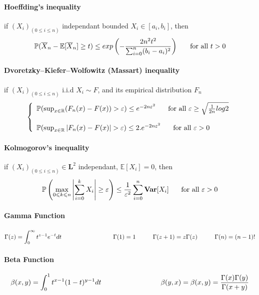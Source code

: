 \documentclass[a4paper,10pt]{article}
\begin{document}
\paragraph{Hoeffding's inequality}
if $(X_{i})_{(0\leqslant i \leqslant n)}$ independant bounded $X_i \in [a_i,b_i]$, then
\[
\mathbb{P}(\overline{X}_n- \mathbb{E}[\overline{X}_n] \geq t) \leq exp\left(-\frac{2n^2t^2}{\sum_{i=0}^{n} (b_i-a_i)^2}\right) 
\hspace{5mm} \text{ for all } t >0
\]

\paragraph{Dvoretzky–Kiefer–Wolfowitz (Massart) inequality}
if $(X_{i})_{(0\leqslant i \leqslant n)}$ i.i.d  $X_i \sim F $, and its empirical distribution $F_n$ 
\[
\left\{
\begin{array}{l}
\mathbb{P}( \sup_{x\in \mathbb{R}} ( {F}_n(x)- F(x) ) > \varepsilon ) \leq e^{-2n\varepsilon^2} 
\hspace{5mm} \text{ for all } \varepsilon \geq \sqrt{\frac{1}{2n}log2} \\ \\
\mathbb{P}( \sup_{x\in \mathbb{R}} | {F}_n(x)- F(x) | > \varepsilon ) \leq 2.e^{-2n\varepsilon^2} 
\hspace{5mm} \text{ for all } \varepsilon > 0
\end{array}
\right.
\]


\paragraph{Kolmogorov's inequality}
if $(X_{i})_{(0\leqslant i \leqslant n)} \in \textbf{L}^2$ independant, $\mathbb{E}[X_i]=0$, then
\[
\mathbb{P}\left( \max_{0\leqslant k \leqslant n}\left| \sum_{i=0}^{k} X_i  \right| 
\geq \varepsilon \right) \leq \frac{1}{\varepsilon^2} \sum_{i=0}^{n} \textbf{Var}[X_i]
\hspace{5mm} \text{ for all } \varepsilon >0
\]

\paragraph{Gamma Function}
\[
\Gamma(z) = \int_{0}^{\infty} t^{z-1}e^{-t}dt 
\hspace{30mm}  \Gamma(1) = 1 
\hspace{10mm}  \Gamma(z+1) = z\Gamma(z) 
\hspace{10mm}  \Gamma(n) = (n-1)! 
\]
\paragraph{Beta Function}
\[
\beta(x,y)=  \int_{0}^{1}  t^{x-1}(1-t)^{y-1}dt  \hspace{30mm} \beta(y,x)=\beta(x,y)= \frac{\Gamma(x)\Gamma(y)}{\Gamma(x+y)}
\]
\end{document}
